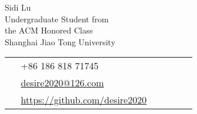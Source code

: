 \documentclass[10pt]{article} %
\begin{document}
\begin{paracol}{2} %


\parbox[top][0.12\textheight][c]{\linewidth}{ %
	\vspace{-0.04\textheight} %
	\centering %
	{\sffamily\Huge Sidi Lu}\\\medskip %
	{\color{headings} Undergraduate Student from}\\
	{\color{headings} the ACM Honored Class}\\
	{\color{headings} Shanghai Jiao Tong University}
}
\parbox[top][0.12\textheight][c]{\linewidth}{ %
	\vspace{-0.04\textheight} %
	\colorbox{shade}{ %
		\begin{supertabular}{p{0.05\linewidth}|p{0.775\linewidth}} %
			\raisebox{-1pt}{\faPhone} & +86 186 818 71745 \\ %
			\raisebox{0pt}{\small\faEnvelope} & \href{mailto:desire2020@126.com}{desire2020@126.com} \\ %
			\raisebox{-1pt}{\small\faGithub} & \href{https://github.com/desire2020}{https://github.com/desire2020} \\ %
		\end{supertabular}
	}
}


\end{paracol}
\end{document}
